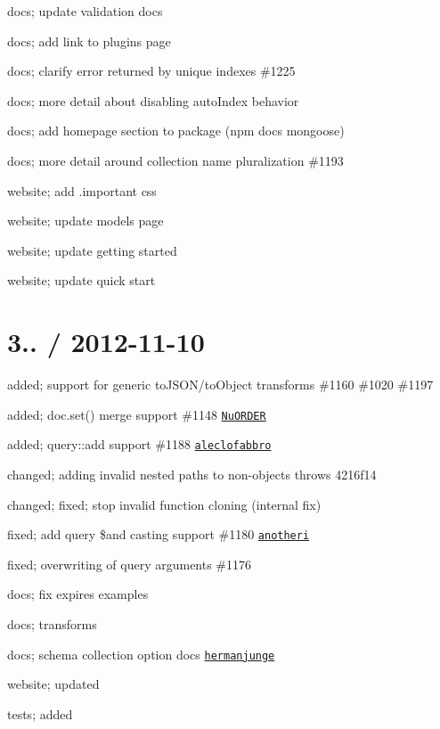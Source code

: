 \begin{DoxyItemize}
\item docs; update validation docs
\item docs; add link to plugins page
\item docs; clarify error returned by unique indexes \#1225
\item docs; more detail about disabling auto\+Index behavior
\item docs; add homepage section to package (npm docs mongoose)
\item docs; more detail around collection name pluralization \#1193
\item website; add .important css
\item website; update models page
\item website; update getting started
\item website; update quick start
\end{DoxyItemize}

\section*{3.. / 2012-\/11-\/10 }


\begin{DoxyItemize}
\item added; support for generic to\+J\+S\+O\+N/to\+Object transforms \#1160 \#1020 \#1197
\item added; doc.\+set() merge support \#1148 \href{https://github.com/NuORDER}{\tt Nu\+O\+R\+D\+ER}
\item added; query\+::add support \#1188 \href{https://github.com/aleclofabbro}{\tt aleclofabbro}
\item changed; adding invalid nested paths to non-\/objects throws 4216f14
\item changed; fixed; stop invalid function cloning (internal fix)
\item fixed; add query \$and casting support \#1180 \href{https://github.com/anotheri}{\tt anotheri}
\item fixed; overwriting of query arguments \#1176
\item docs; fix expires examples
\item docs; transforms
\item docs; schema {\ttfamily collection} option docs \href{https://github.com/hermanjunge}{\tt hermanjunge}
\item website; updated
\item tests; added
\end{DoxyItemize}

